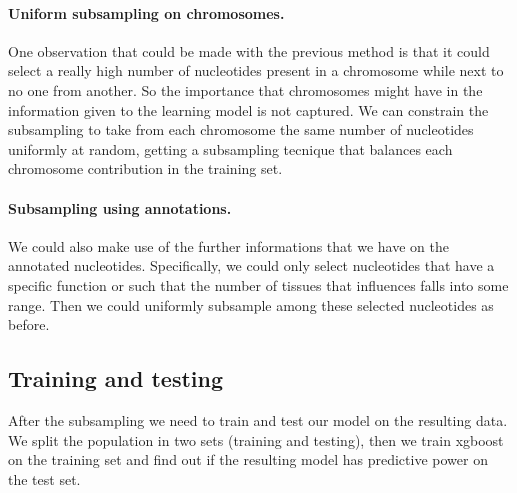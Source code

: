 \paragraph{Uniform subsampling on chromosomes.}
One observation that could be made with the previous method is that it could select a really high number of nucleotides present in a chromosome while next to no one from another. 
So the importance that chromosomes might have in the information given to the learning model is not captured. 
We can constrain the subsampling to take from each chromosome the same number of nucleotides uniformly at random, getting a subsampling tecnique that balances each chromosome contribution in the training set.

\paragraph{Subsampling using annotations.}
We could also make use of the further informations that we have on the annotated nucleotides.
Specifically, we could only select nucleotides that have a specific function or such that the number of tissues that influences falls into some range.
Then we could uniformly subsample among these selected nucleotides as before.


\subsection{Training and testing}

After the subsampling we need to train and test our model on the resulting data. 
We split the population in two sets (training and testing), then we train xgboost on the training set and find out if the resulting model has predictive power on the test set.
